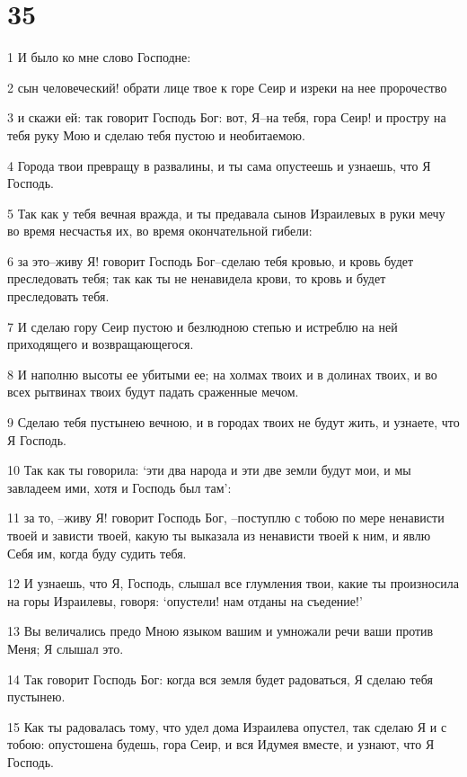 \chapter{35}

\par 1 И было ко мне слово Господне:
\par 2 сын человеческий! обрати лице твое к горе Сеир и изреки на нее пророчество
\par 3 и скажи ей: так говорит Господь Бог: вот, Я--на тебя, гора Сеир! и простру на тебя руку Мою и сделаю тебя пустою и необитаемою.
\par 4 Города твои превращу в развалины, и ты сама опустеешь и узнаешь, что Я Господь.
\par 5 Так как у тебя вечная вражда, и ты предавала сынов Израилевых в руки мечу во время несчастья их, во время окончательной гибели:
\par 6 за это--живу Я! говорит Господь Бог--сделаю тебя кровью, и кровь будет преследовать тебя; так как ты не ненавидела крови, то кровь и будет преследовать тебя.
\par 7 И сделаю гору Сеир пустою и безлюдною степью и истреблю на ней приходящего и возвращающегося.
\par 8 И наполню высоты ее убитыми ее; на холмах твоих и в долинах твоих, и во всех рытвинах твоих будут падать сраженные мечом.
\par 9 Сделаю тебя пустынею вечною, и в городах твоих не будут жить, и узнаете, что Я Господь.
\par 10 Так как ты говорила: `эти два народа и эти две земли будут мои, и мы завладеем ими, хотя и Господь был там':
\par 11 за то, --живу Я! говорит Господь Бог, --поступлю с тобою по мере ненависти твоей и зависти твоей, какую ты выказала из ненависти твоей к ним, и явлю Себя им, когда буду судить тебя.
\par 12 И узнаешь, что Я, Господь, слышал все глумления твои, какие ты произносила на горы Израилевы, говоря: `опустели! нам отданы на съедение!'
\par 13 Вы величались предо Мною языком вашим и умножали речи ваши против Меня; Я слышал это.
\par 14 Так говорит Господь Бог: когда вся земля будет радоваться, Я сделаю тебя пустынею.
\par 15 Как ты радовалась тому, что удел дома Израилева опустел, так сделаю Я и с тобою: опустошена будешь, гора Сеир, и вся Идумея вместе, и узнают, что Я Господь.

